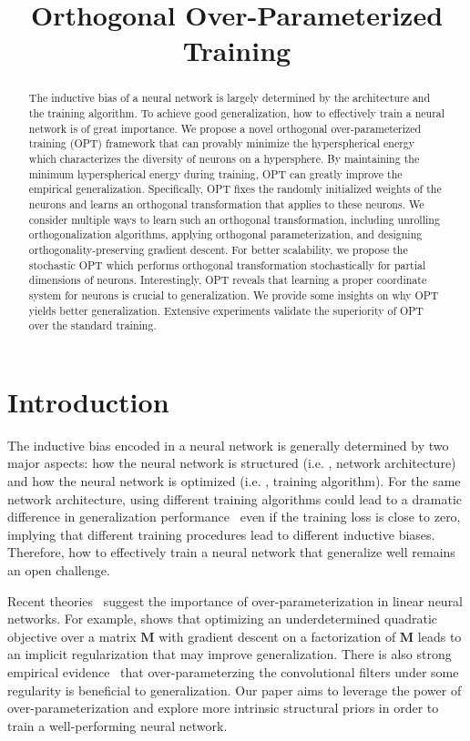 \title{Orthogonal Over-Parameterized Training}

\begin{abstract}
The inductive bias of a neural network is largely determined by the architecture and the training algorithm. To achieve good generalization, how to effectively train a neural network is of great importance. We propose a novel orthogonal over-parameterized training (OPT) framework that can provably minimize the hyperspherical energy which characterizes the diversity of neurons on a hypersphere. By maintaining the minimum hyperspherical energy during training, OPT can greatly improve the empirical generalization. Specifically, OPT fixes the randomly initialized weights of the neurons and learns an orthogonal transformation that applies to these neurons. We consider multiple ways to learn such an orthogonal transformation, including unrolling orthogonalization algorithms, applying orthogonal parameterization, and designing orthogonality-preserving gradient descent. For better scalability, we propose the stochastic OPT which performs orthogonal transformation stochastically for partial dimensions of neurons. Interestingly, OPT reveals that learning a proper coordinate system for neurons is crucial to generalization. We provide some insights on why OPT yields better generalization. Extensive experiments validate the superiority of OPT over the standard training.
\end{abstract}

\section{Introduction}

The inductive bias encoded in a neural network is generally determined by two major aspects: how the neural network is structured (i.e. , network architecture) and how the neural network is optimized (i.e. , training algorithm). For the same network architecture, using different training algorithms could lead to a dramatic difference in generalization performance~\cite{keskar2017improving,reddi2019convergence} even if the training loss is close to zero, implying that different training procedures lead to different inductive biases. Therefore, how to effectively train a neural network that generalize well remains an open challenge.
\par

Recent theories~\cite{gunasekar2017implicit,gunasekar2018implicit,kawaguchi2016deep,li2018algorithmic} suggest the importance of over-parameterization in linear neural networks. For example, \cite{gunasekar2017implicit} shows that optimizing an underdetermined quadratic objective over a matrix $\bm{M}$ with gradient descent on a factorization of $\bm{M}$ leads to an implicit regularization that may improve generalization. There is also strong empirical evidence~\cite{ding2019acnet,liu2019neural} that over-parameterzing the convolutional filters under some regularity is beneficial to generalization. Our paper aims to leverage the power of over-parameterization and explore more intrinsic structural priors in order to train a well-performing neural network.


